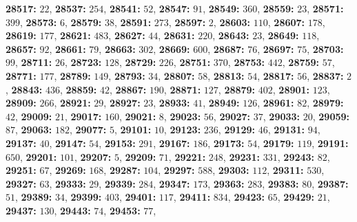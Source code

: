 \textsf{\bfseries 28517:} $22$, \textsf{\bfseries 28537:} $254$, \textsf{\bfseries 28541:} $52$, \textsf{\bfseries 28547:} $91$, \textsf{\bfseries 28549:} $360$, \textsf{\bfseries 28559:} $23$, \textsf{\bfseries 28571:} $399$, \textsf{\bfseries 28573:} $6$, \textsf{\bfseries 28579:} $38$, \textsf{\bfseries 28591:} $273$, \textsf{\bfseries 28597:} $2$, \textsf{\bfseries 28603:} $110$, \textsf{\bfseries 28607:} $178$, \textsf{\bfseries 28619:} $177$, \textsf{\bfseries 28621:} $483$, \textsf{\bfseries 28627:} $44$, \textsf{\bfseries 28631:} $220$, \textsf{\bfseries 28643:} $23$, \textsf{\bfseries 28649:} $118$, \textsf{\bfseries 28657:} $92$, \textsf{\bfseries 28661:} $79$, \textsf{\bfseries 28663:} $302$, \textsf{\bfseries 28669:} $600$, \textsf{\bfseries 28687:} $76$, \textsf{\bfseries 28697:} $75$, \textsf{\bfseries 28703:} $99$, \textsf{\bfseries 28711:} $26$, \textsf{\bfseries 28723:} $128$, \textsf{\bfseries 28729:} $226$, \textsf{\bfseries 28751:} $370$, \textsf{\bfseries 28753:} $442$, \textsf{\bfseries 28759:} $57$, \textsf{\bfseries 28771:} $177$, \textsf{\bfseries 28789:} $149$, \textsf{\bfseries 28793:} $34$, \textsf{\bfseries 28807:} $58$, \textsf{\bfseries 28813:} $54$, \textsf{\bfseries 28817:} $56$, \textsf{\bfseries 28837:} $2$, \textsf{\bfseries 28843:} $436$, \textsf{\bfseries 28859:} $42$, \textsf{\bfseries 28867:} $190$, \textsf{\bfseries 28871:} $127$, \textsf{\bfseries 28879:} $402$, \textsf{\bfseries 28901:} $123$, \textsf{\bfseries 28909:} $266$, \textsf{\bfseries 28921:} $29$, \textsf{\bfseries 28927:} $23$, \textsf{\bfseries 28933:} $41$, \textsf{\bfseries 28949:} $126$, \textsf{\bfseries 28961:} $82$, \textsf{\bfseries 28979:} $42$, \textsf{\bfseries 29009:} $21$, \textsf{\bfseries 29017:} $160$, \textsf{\bfseries 29021:} $8$, \textsf{\bfseries 29023:} $56$, \textsf{\bfseries 29027:} $37$, \textsf{\bfseries 29033:} $20$, \textsf{\bfseries 29059:} $87$, \textsf{\bfseries 29063:} $182$, \textsf{\bfseries 29077:} $5$, \textsf{\bfseries 29101:} $10$, \textsf{\bfseries 29123:} $236$, \textsf{\bfseries 29129:} $46$, \textsf{\bfseries 29131:} $94$, \textsf{\bfseries 29137:} $40$, \textsf{\bfseries 29147:} $54$, \textsf{\bfseries 29153:} $291$, \textsf{\bfseries 29167:} $186$, \textsf{\bfseries 29173:} $54$, \textsf{\bfseries 29179:} $119$, \textsf{\bfseries 29191:} $650$, \textsf{\bfseries 29201:} $101$, \textsf{\bfseries 29207:} $5$, \textsf{\bfseries 29209:} $71$, \textsf{\bfseries 29221:} $248$, \textsf{\bfseries 29231:} $331$, \textsf{\bfseries 29243:} $82$, \textsf{\bfseries 29251:} $67$, \textsf{\bfseries 29269:} $168$, \textsf{\bfseries 29287:} $104$, \textsf{\bfseries 29297:} $588$, \textsf{\bfseries 29303:} $112$, \textsf{\bfseries 29311:} $530$, \textsf{\bfseries 29327:} $63$, \textsf{\bfseries 29333:} $29$, \textsf{\bfseries 29339:} $284$, \textsf{\bfseries 29347:} $173$, \textsf{\bfseries 29363:} $283$, \textsf{\bfseries 29383:} $80$, \textsf{\bfseries 29387:} $51$, \textsf{\bfseries 29389:} $34$, \textsf{\bfseries 29399:} $403$, \textsf{\bfseries 29401:} $117$, \textsf{\bfseries 29411:} $834$, \textsf{\bfseries 29423:} $65$, \textsf{\bfseries 29429:} $21$, \textsf{\bfseries 29437:} $130$, \textsf{\bfseries 29443:} $74$, \textsf{\bfseries 29453:} $77$, 

